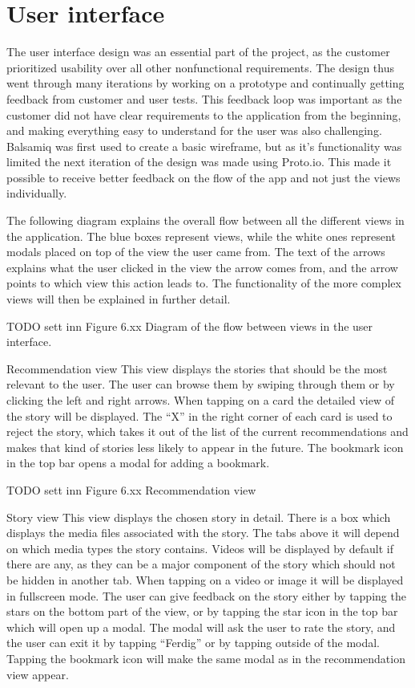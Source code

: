 \section{User interface}

The user interface design was an essential part of the project, as the customer prioritized usability over all other nonfunctional requirements. The design thus went through many iterations by working on a prototype and continually getting feedback from customer and user tests. This feedback loop was important as the customer did not have clear requirements to the application from the beginning, and making everything easy to understand for the user was also challenging.  Balsamiq was first used to create a basic wireframe, but as it’s functionality was limited the next iteration of the design was made using Proto.io. This made it possible to receive better feedback on the flow of the app and not just the views individually. \newline

The following diagram explains the overall flow between all the different views in the application. The blue boxes represent views, while the white ones represent modals placed on top of the view the user came from. The text of the arrows explains what the user clicked in the view the arrow comes from, and the arrow points to which view this action leads to.  The functionality of the more complex views will then be explained in further detail.

TODO sett inn Figure 6.xx Diagram of the flow between views in the user interface.\newline

Recommendation view\newline
This view displays the stories that should be the most relevant to the user. The user can browse them by swiping through them or by clicking the left and right arrows. When tapping on a card the detailed view of the story will be displayed. The “X” in the right corner of each card is used to reject the story, which takes it out of the list of the current recommendations and makes that kind of stories less likely to appear in the future. The bookmark icon in the top bar opens a modal for adding a bookmark. 

TODO sett inn Figure 6.xx Recommendation view\newline

Story view\newline
This view displays the chosen story in detail. There is a box which displays the media files associated with the story. The tabs above it will depend on which media types the story contains. Videos will be displayed by default if there are any, as they can be a major component of the story which should not be hidden in another tab. When tapping on a video or image it will be displayed in fullscreen mode. The user can give feedback on the story either by tapping the stars on the bottom part of the view, or by tapping the star icon in the top bar which will open up a modal. The modal will ask the user to rate the story, and the user can exit it by tapping “Ferdig” or by tapping outside of the modal. Tapping the bookmark icon will make the same modal as in the recommendation view appear.

